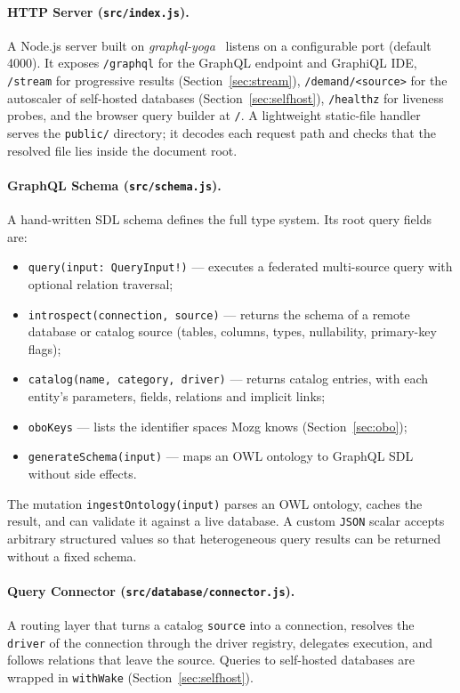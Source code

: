 \documentclass[sigconf,nonacm]{acmart}
\begin{document}
\paragraph{HTTP Server (\textup{\texttt{src/index.js}}).}
A Node.js server built on \emph{graphql-yoga}~\cite{graphqlyoga}
listens on a configurable port (default 4000).  It exposes
\texttt{/graphql} for the GraphQL endpoint and GraphiQL IDE,
\texttt{/stream} for progressive results (Section~\ref{sec:stream}),
\texttt{/demand/<source>} for the autoscaler of self-hosted databases
(Section~\ref{sec:selfhost}), \texttt{/healthz} for liveness probes,
and the browser query builder at \texttt{/}.  A lightweight
static-file handler serves the \texttt{public/} directory; it decodes
each request path and checks that the resolved file lies inside the
document root.

\paragraph{GraphQL Schema (\textup{\texttt{src/schema.js}}).}
A hand-written SDL schema defines the full type system.  Its root
query fields are:
\begin{itemize}
  \item \texttt{query(input: QueryInput!)} --- executes a federated
        multi-source query with optional relation traversal;
  \item \texttt{introspect(connection, source)} --- returns the schema
        of a remote database or catalog source (tables, columns, types,
        nullability, primary-key flags);
  \item \texttt{catalog(name, category, driver)} --- returns catalog
        entries, with each entity's parameters, fields, relations and
        implicit links;
  \item \texttt{oboKeys} --- lists the identifier spaces Mozg knows
        (Section~\ref{sec:obo});
  \item \texttt{generateSchema(input)} --- maps an OWL ontology to
        GraphQL SDL without side effects.
\end{itemize}
The mutation \texttt{ingestOntology(input)} parses an OWL ontology,
caches the result, and can validate it against a live database.  A
custom \texttt{JSON} scalar accepts arbitrary structured values so that
heterogeneous query results can be returned without a fixed schema.

\paragraph{Query Connector (\textup{\texttt{src/database/connector.js}}).}
A routing layer that turns a catalog \texttt{source} into a connection,
resolves the \texttt{driver} of the connection through the driver
registry, delegates execution, and follows relations that leave the
source.  Queries to self-hosted databases are wrapped in
\texttt{withWake} (Section~\ref{sec:selfhost}).
\end{document}
